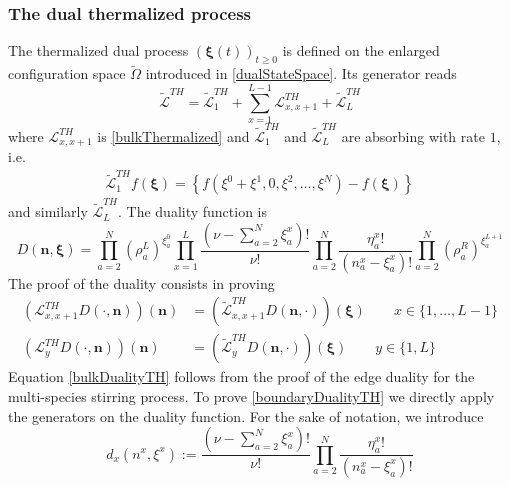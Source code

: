 \documentclass[11pt]{article}
\numberwithin{equation}{section}
\numberwithin{equation}{subsection}
\begin{document}
\subsubsection{The dual thermalized process}
The thermalized dual process $(\bm{\xi}(t))_{t\geq 0}$ is defined on the enlarged configuration space $\widetilde{\Omega}$ introduced in \eqref{dualStateSpace}. Its generator reads
\begin{equation}
		\widetilde{\mathcal{L}}^{TH}=\widetilde{\mathcal{L}}_{1}^{TH}+\sum_{x=1}^{L-1}\mathcal{L}_{x,x+1}^{TH}+\widetilde{\mathcal{L}}_{L}^{TH}
\end{equation}
where $\mathcal{L}^{TH}_{x,x+1}$ is \eqref{bulkThermalized} and $\widetilde{\mathcal{L}}_{1}^{TH}$ and $\widetilde{\mathcal{L}}_{L}^{TH}$ are absorbing with rate $1$, i.e. 
\begin{equation}
	\begin{split}
		\widetilde{\mathcal{L}}_{1}^{TH}f(\bm{\xi})=\left\{f(\xi^{0}+\xi^{1},0,\xi^{2},\ldots,\xi^{N})-f(\bm{\xi})\right\}
	\end{split}
\end{equation}
and similarly $\widetilde{\mathcal{L}}_{L}^{TH}$. 
The duality function is 
\begin{equation}
	D(\bm{n},\bm{\xi})=\prod_{a=2}^{N}\left(\rho_{a}^{L}\right)^{\xi_{a}^{0}}\prod_{x=1}^{L}\frac{(\nu-\sum_{a=2}^{N}\xi_{a}^{x})!}{\nu!}\prod_{a=2}^{N}\frac{\eta_{a}^{x}!}{(n_{a}^{x}-\xi_{a}^{x})!}\prod_{a=2}^{N}\left(\rho_{a}^{R}\right)^{\xi_{a}^{L+1}}
\end{equation}
The proof of the duality consists in proving 
\begin{align}
	\left(\mathcal{L}_{x,x+1}^{TH}D(\cdot,\bm{n})\right)(\bm{n})&=\left(\widetilde{\mathcal{L}}_{x,x+1}^{TH}D(\bm{n},\cdot)\right)(\bm{\xi})\qquad x\in \{1,\ldots,L-1\}\label{bulkDualityTH}\\
	\left(\mathcal{L}_{y}^{TH}D(\cdot,\bm{n})\right)(\bm{n})&=\left(\widetilde{\mathcal{L}}_{y}^{TH}D(\bm{n},\cdot)\right)(\bm{\xi})\qquad y\in\{1,L\}\label{boundaryDualityTH}
\end{align}
Equation \eqref{bulkDualityTH} follows from the proof of the edge duality for the multi-species stirring process. To prove \eqref{boundaryDualityTH} we directly apply the generators on the duality function. For the sake of notation, we introduce 
\begin{equation}
	d_{x}(n^{x},\xi^{x}):=\frac{(\nu-\sum_{a=2}^{N}\xi_{a}^{x})!}{\nu!}\prod_{a=2}^{N}\frac{\eta_{a}^{x}!}{(n_{a}^{x}-\xi_{a}^{x})!}
\end{equation}
\end{document}
